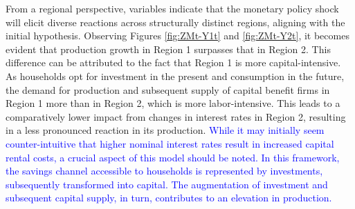 \documentclass[../thesis.tex]{subfiles}
\begin{document}


From a regional perspective, variables indicate that the monetary policy shock will elicit diverse reactions across structurally distinct regions, aligning with the initial hypothesis. Observing Figures \eqref{fig:ZMt-Y1t} and \eqref{fig:ZMt-Y2t}, it becomes evident that production growth in Region 1 surpasses that in Region 2. This difference can be attributed to the fact that Region 1 is more capital-intensive. As households opt for investment in the present and consumption in the future, the demand for production and subsequent supply of capital benefit firms in Region 1 more than in Region 2, which is more labor-intensive. This leads to a comparatively lower impact from changes in interest rates in Region 2, resulting in a less pronounced reaction in its production. \textcolor{blue}{While it may initially seem counter-intuitive that higher nominal interest rates result in increased capital rental costs, a crucial aspect of this model should be noted. In this framework, the savings channel accessible to households is represented by investments, subsequently transformed into capital. The augmentation of investment and subsequent capital supply, in turn, contributes to an elevation in production.}
\end{document}

